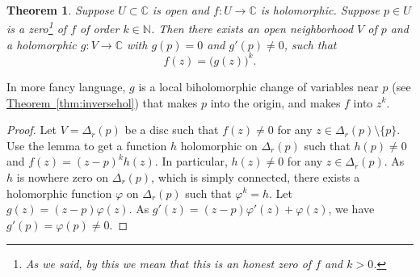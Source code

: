 \documentclass[12pt,openany]{book}
\newcommand{\C}{{\mathbb{C}}}
\newcommand{\N}{{\mathbb{N}}}
\theoremstyle{plain}
\newtheorem{thm}{Theorem}[section]
\theoremstyle{remark}
\theoremstyle{definition}
\theoremstyle{exercise}
\theoremstyle{example}
\newcommand{\thmref}[1]{\hyperref[#1]{Theorem~\ref*{#1}}}
\begin{document}
\begin{thm}
Suppose $U \subset \C$ is open and $f \colon U \to \C$ is holomorphic.
Suppose $p \in U$ is a zero\footnote{As we said, by this we mean that
this is an honest zero of $f$ and $k > 0$.}
of $f$ of order $k \in \N$.  Then there exists an open neighborhood $V$
of $p$ and a holomorphic $g \colon V \to \C$ with
$g(p) = 0$ and $g'(p) \not= 0$,
such that
\begin{equation*}
f(z) = {\bigl( g(z) \bigr)}^k.
\end{equation*}
\end{thm}

In more fancy language, $g$ is a local biholomorphic change of variables near
$p$ (see \thmref{thm:inversehol})
that makes $p$ into the origin, and makes $f$ into $z^k$.

\begin{proof}
Let $V = \Delta_r(p)$ be a disc such that $f(z) \not= 0$ for any $z \in
\Delta_r(p) \setminus \{ p \}$.  Use the lemma to get a function $h$ holomorphic
on $\Delta_r(p)$ such that $h(p) \not= 0$ and $f(z) = {(z-p)}^k h(z)$.  In particular,
$h(z) \not= 0$ for any $z \in \Delta_r(p)$.
As $h$ is nowhere zero on $\Delta_r(p)$, which is simply connected,
there exists a holomorphic function $\varphi$ on $\Delta_r(p)$ such that
$\varphi^k = h$.  Let $g(z) = (z-p)\varphi(z)$.  As
$g'(z) = (z-p) \varphi'(z) + \varphi(z)$, we have $g'(p) = \varphi(p) \not= 0$.
\end{proof}
\end{document}
